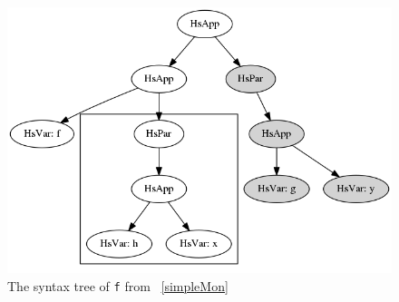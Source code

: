 \begin{figure}[t]
	\begin{center}
		\includegraphics[scale=.5]{graphVis/Chapter6/simpF.png}
	\end{center}
	\caption{The syntax tree of \texttt{f} from \DIFdelbeginFL {}\DIFdelendFL \DIFaddbeginFL {}\DIFaddendFL ~\ref{simpleMon}}
	\label{simpF}
\end{figure}

